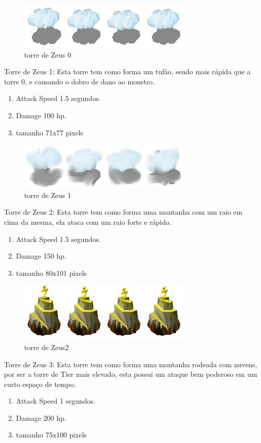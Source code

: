 \documentclass[11pt]{article} %
\begin{document}
\begin{figure}[!htp]
\centering
\includegraphics[scale=1]{res/towers/tower_0.png}
\caption{torre de Zeus 0}
\end{figure}

Torre de Zeus 1: Esta torre tem como forma um tufão, sendo mais rápida que a torre 0, e causando o dobro de dano ao monstro.
\begin{enumerate}
\item Attack Speed 1.5 segundos.
\item Damage 100 hp.
\item tamanho 71x77 pixels
\end{enumerate}

\begin{figure}[!htp]
\centering
\includegraphics[scale=1.3]{res/towers/tower_1.png}
\caption{torre de Zeus 1}
\end{figure}

Torre de Zeus 2: Esta torre tem como forma uma montanha com um raio em cima da mesma, ela ataca com um raio forte e rápido.
\begin{enumerate}
\item Attack Speed 1.5 segundos.
\item Damage 150 hp.
\item tamanho 80x101 pixels
\end{enumerate}

\begin{figure}[!htp]
\centering
\includegraphics[scale=1.3]{res/towers/tower_2.png}
\caption{torre de Zeus2 }
\end{figure}

Torre de Zeus 3: Esta torre tem como forma uma montanha rodeada com nuvens, por ser a torre de Tier mais elevado, esta possui um ataque bem poderoso em um curto espaço de tempo.
\begin{enumerate}
\item Attack Speed 1 segundos.
\item Damage 200 hp.
\item tamanho 75x100 pixels
\end{enumerate}
\end{document}
